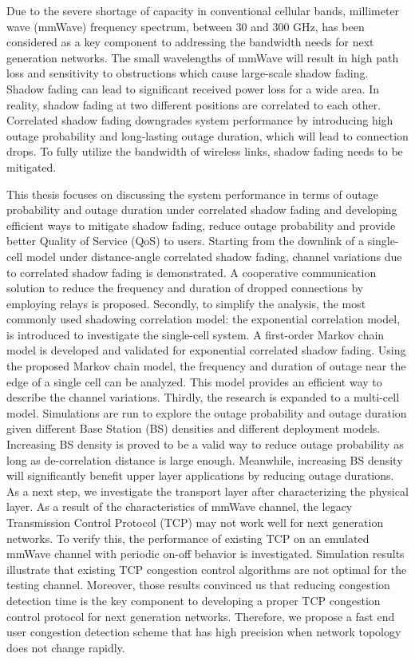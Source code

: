 \par Due to the severe shortage of capacity in conventional cellular bands, millimeter wave (mmWave) frequency spectrum, between 30 and 300 GHz, has been considered as a key component to addressing the bandwidth needs for next generation networks. The small wavelengths of mmWave will result in high path loss and sensitivity to obstructions which cause large-scale shadow fading. Shadow fading can lead to significant received power loss for a wide area. In reality, shadow fading at two different positions are correlated to each other. Correlated shadow fading downgrades system performance by introducing high outage probability and long-lasting outage duration, which will lead to connection drops. To fully utilize the bandwidth of wireless links, shadow fading needs to be mitigated.
\par This thesis focuses on discussing the system performance in terms of outage probability and outage duration under correlated shadow fading and developing efficient ways to mitigate shadow fading, reduce outage probability and provide better Quality of Service (QoS) to users. Starting from the downlink of a single-cell model under distance-angle correlated shadow fading, channel variations due to correlated shadow fading is demonstrated. A cooperative communication solution to reduce the frequency and duration of dropped connections by employing relays is proposed. Secondly, to simplify the analysis, the most commonly used shadowing correlation model: the exponential correlation model, is introduced to investigate the single-cell system. A first-order Markov chain model is developed and validated for exponential correlated shadow fading. Using the proposed Markov chain model, the frequency and duration of outage near the edge of a single cell can be analyzed. This model provides an efficient way to describe the channel variations. Thirdly, the research is expanded to a multi-cell model. Simulations are run to explore the outage probability and outage duration given different Base Station (BS) densities and different deployment models. Increasing BS density is proved to be a valid way to reduce outage probability as long as de-correlation distance is large enough. Meanwhile, increasing BS density will significantly benefit upper layer applications by reducing outage durations. As a next step, we investigate the transport layer after characterizing the physical layer. As a result of the characteristics of mmWave channel, the legacy Transmission Control Protocol (TCP) may not work well for next generation networks. To verify this, the performance of existing TCP on an emulated mmWave channel with periodic on-off behavior is investigated. Simulation results illustrate that existing TCP congestion control algorithms are not optimal for the testing channel. Moreover, those results convinced us that reducing congestion detection time is the key component to developing a proper TCP congestion control protocol for next generation networks. Therefore, we propose a fast end user congestion detection scheme that has high precision when network topology does not change rapidly.


